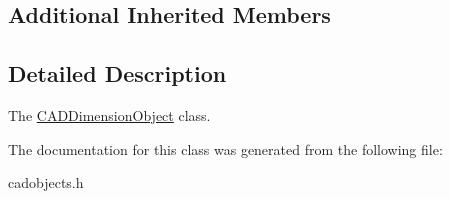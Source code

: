 \subsection*{Additional Inherited Members}


\subsection{Detailed Description}
The \hyperlink{class_c_a_d_dimension_object}{C\+A\+D\+Dimension\+Object} class. 

The documentation for this class was generated from the following file\+:\begin{DoxyCompactItemize}
\item 
cadobjects.\+h\end{DoxyCompactItemize}
